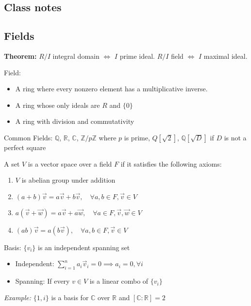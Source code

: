 \documentclass[11pt]{article}
\newcommand{\R}{\mathbb{R}}
\newcommand{\Z}{\mathbb{Z}}
\newcommand{\C}{\mathbb{C}}
\newcommand{\Q}{\mathbb{Q}}
\begin{document}
\begin{multicols}{2}
\section*{Class notes}

    \subsection*{Fields}
        \textbf{Theorem:} $R/I$ integral domain $\iff$ $I$ prime ideal. $R/I$ field $\iff$ $I$ maximal ideal.

        Field:
        \begin{itemize}
            \item A ring where every nonzero element has a multiplicative inverse.
            \item A ring whose only ideals are $R$ and $\{0\}$
            \item A ring with division and commutativity 
        \end{itemize}

        Common Fields: $\Q$, $\R$, $\C$, $\Z/p\Z$ where $p$ is prime, $Q[\sqrt 2]$, $\Q[\sqrt D]$ if $D$ is not a perfect square 

        A set $V$ is a vector space over a field $F$ if it satisfies the following axioms:
        \begin{enumerate}
            \item $V$ is abelian group under addition 
            \item $(a + b)\vec v = a\vec v + b\vec v, \quad \forall a, b \in F, \vec v \in V$
            \item $a(\vec v + \vec w) = a\vec v + a\vec w, \quad \forall a \in F, \vec v, \vec w \in V$
            \item $(ab)\vec v = a(b\vec v), \quad \forall a, b \in F, \vec v \in V$
        \end{enumerate}

        Basis: $\{v_i\}$ is an independent spanning set 
        \begin{itemize}
            \item Independent: $\sum_{i=1}^n a_i\vec v_i = 0 \implies a_i = 0, \forall i$
            \item Spanning: If every $v \in V$ is a linear combo of $\{v_i\}$
        \end{itemize}
        \emph{Example:} $\{1, i\}$ is a basis for $\C$ over $\R$ and $[\C: \R] = 2$


\end{multicols}
\end{document}
